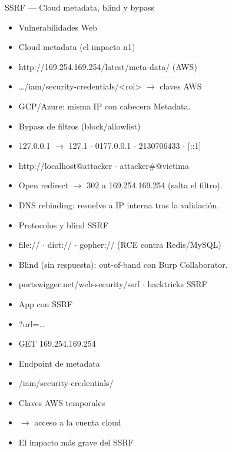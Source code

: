 \documentclass[aspectratio=169,10pt]{beamer}
\begin{document}
\begin{frame}[allowframebreaks]{SSRF --- Cloud metadata, blind y bypass}
\small
  \begin{itemize}
  \item Vulnerabilidades Web
  \item Cloud metadata (el impacto n1)
  \item http://169.254.169.254/latest/meta-data/ (AWS)
  \item \dots{}/iam/security-credentials/\textless{}rol\textgreater{} $\rightarrow$ claves AWS
  \item GCP/Azure: misma IP con cabecera Metadata.
  \item Bypass de filtros (block/allowlist)
  \item 127.0.0.1 $\rightarrow$ 127.1 $\cdot$ 0177.0.0.1 $\cdot$ 2130706433 $\cdot$ [::1]
  \item http://localhost@attacker $\cdot$ attacker\#@victima
  \item Open redirect $\rightarrow$ 302 a 169.254.169.254 (salta el filtro).
  \item DNS rebinding: resuelve a IP interna tras la validación.
  \item Protocolos y blind SSRF
  \item file:// $\cdot$ dict:// $\cdot$ gopher:// (RCE contra Redis/MySQL)
  \item Blind (sin respuesta): out-of-band con Burp Collaborator.
  \item portswigger.net/web-security/ssrf $\cdot$ hacktricks SSRF
  \item App con SSRF
  \item ?url=\dots{}
  \item GET 169.254.169.254
  \item Endpoint de metadata
  \item /iam/security-credentials/
  \item Claves AWS temporales
  \item $\rightarrow$ acceso a la cuenta cloud
  \item El impacto más grave del SSRF
  \end{itemize}
\end{frame}
\end{document}
